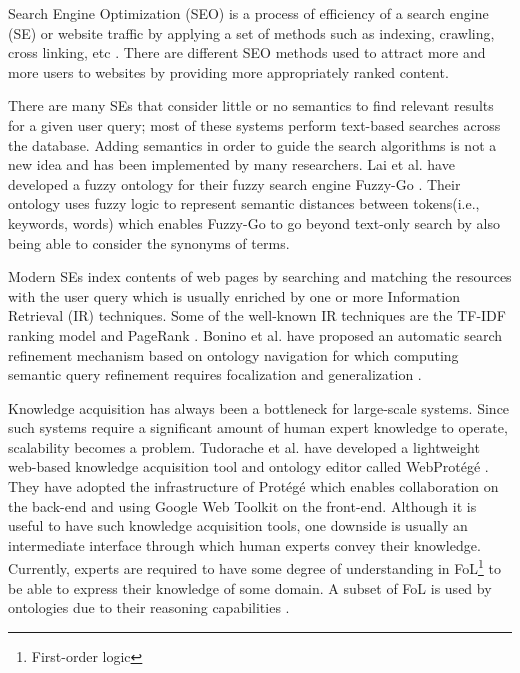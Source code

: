 Search Engine Optimization (SEO) is a process of efficiency of a search engine (SE) or website traffic 
by applying a set of methods such as indexing, crawling, cross linking, etc \cite{enwiki:1082522144}. 
There are different SEO methods used to attract more and more users to websites by providing more 
appropriately ranked content.

There are many SEs that consider little or no semantics to find relevant results for a given user 
query; most of these systems perform text-based searches across the database. Adding semantics in 
order to guide the search algorithms is not a new idea and has been implemented by many researchers. 
Lai et al. have developed a fuzzy ontology for their fuzzy search engine Fuzzy-Go \cite{6007378}. 
Their ontology uses fuzzy logic to represent semantic distances between tokens(i.e., keywords, words) 
which enables Fuzzy-Go to go beyond text-only search by also being able to consider the synonyms of 
terms. 

Modern SEs index contents of web pages by searching and matching the resources with the user query 
which is usually enriched by one or more Information Retrieval (IR) techniques. Some of the well-known 
IR techniques are the TF-IDF ranking model \cite{enwiki:1092578440} and 
PageRank \cite{enwiki:1094205204}. 
Bonino et al. have proposed an automatic search refinement mechanism based on ontology navigation for 
which computing semantic query refinement requires focalization and generalization 
\cite{bonino2004ontology}. 


Knowledge acquisition has always been a bottleneck for large-scale systems. Since such systems require 
a significant amount of human expert knowledge to operate, scalability becomes a problem. 
Tudorache et al. have developed a lightweight web-based knowledge acquisition tool and ontology editor 
called WebProt\'eg\'e \cite{tudorache2013webprotege}. They have adopted the infrastructure of 
Prot\'eg\'e which enables collaboration on the back-end and using Google Web Toolkit on the front-end. 
Although it is useful to have such knowledge acquisition tools, one downside is usually an intermediate 
interface through which human experts convey their knowledge. Currently, experts are required to 
have some degree of understanding in FoL\footnote{First-order logic} \cite{fitting2012first} to be 
able to express their knowledge of some domain. A subset of FoL is used by ontologies due to their 
reasoning capabilities \cite{pease2007first}.
